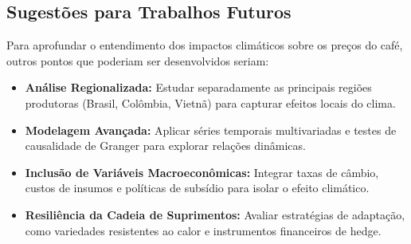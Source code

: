 \documentclass[12pt]{article}
\begin{document}
\subsection{Sugestões para Trabalhos Futuros}
Para aprofundar o entendimento dos impactos climáticos sobre os preços do café, outros pontos que poderiam ser desenvolvidos seriam:

\begin{itemize}
  \item \textbf{Análise Regionalizada:} Estudar separadamente as principais regiões produtoras (Brasil, Colômbia, Vietnã) para capturar efeitos locais do clima.
  \item \textbf{Modelagem Avançada:} Aplicar séries temporais multivariadas e testes de causalidade de Granger para explorar relações dinâmicas.
  \item \textbf{Inclusão de Variáveis Macroeconômicas:} Integrar taxas de câmbio, custos de insumos e políticas de subsídio para isolar o efeito climático.
  \item \textbf{Resiliência da Cadeia de Suprimentos:} Avaliar estratégias de adaptação, como variedades resistentes ao calor e instrumentos financeiros de hedge.
\end{itemize}



\end{document}
